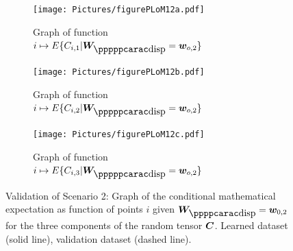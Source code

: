 \begin{figure}[!htb]
    \begin{center}
        \begin{subfigure}[b]{0.32\textwidth}
            \begin{center}
                \texttt{[image: Pictures/figurePLoM12a.pdf]}
            \end{center}
                \caption{Graph of function $i\mapsto E\{ C_{i,1} \vert \bfW_\disppp = \bfw_{o,2} \}$}
                \label{fig:figurePLoM12a}
            \end{subfigure}
            \begin{subfigure}[b]{0.32\textwidth}
            \centering
                \begin{center}
                    \texttt{[image: Pictures/figurePLoM12b.pdf]}
                \end{center}
                \caption{Graph of function $i\mapsto E\{ C_{i,2} \vert \bfW_\disppp = \bfw_{o,2} \}$}
                \label{fig:figurePLoM12b}
            \end{subfigure}
            \begin{subfigure}[b]{0.32\textwidth}
                \begin{center}
                    \texttt{[image: Pictures/figurePLoM12c.pdf]}
                \end{center}
                \caption{Graph of function $i\mapsto E\{ C_{i,3} \vert \bfW_\disppp = \bfw_{o,2} \}$}
                \label{fig:figurePLoM12c}
            \end{subfigure}
    \end{center}
    \caption[Validation of Scenario 2: Graph of the conditional mathematical expectation.]{Validation of Scenario 2: Graph of the conditional mathematical expectation as function of points $i$ given $\bfW_\dispp =\bfw_{0,2}$ for the three components of the random tensor ${\boldsymbol{C}}$.  Learned dataset (solid line), validation dataset (dashed line).}
    \label{fig:figurePLoM12}
\end{figure}
%
